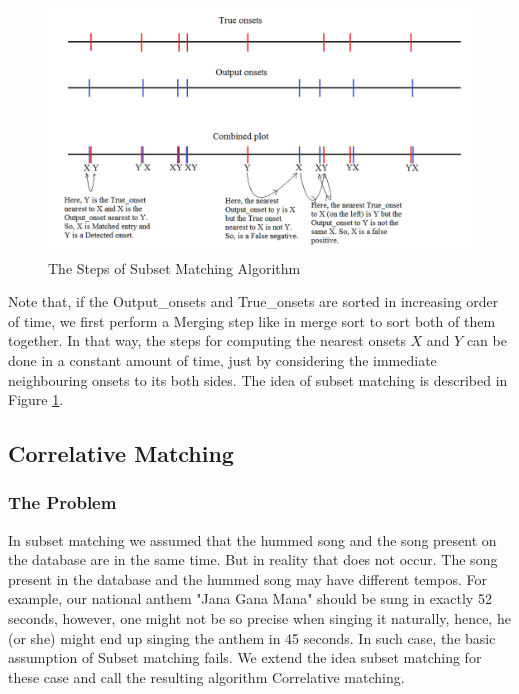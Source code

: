 \documentclass[10pt]{article}
\begin{document}
\begin{figure}
    \centering
    \includegraphics[width = \textwidth]{subset_matching.png}
    \caption{The Steps of Subset Matching Algorithm}
    \label{fig:subset_matching}
\end{figure}

Note that, if the Output\_onsets and True\_onsets are sorted in increasing order of time, we first perform a Merging step like in merge sort to sort both of them together. In that way, the steps for computing the nearest onsets $X$ and $Y$ can be done in a constant amount of time, just by considering the immediate neighbouring onsets to its both sides. The idea of subset matching is described in Figure \ref{fig:subset_matching}.

\subsection{Correlative Matching}

\subsubsection{The Problem}
In subset matching we assumed that the hummed song and the song present on the database are in the same time. But in reality that does not occur. The song present in the database and the hummed song may have different tempos. For example, our national anthem "Jana Gana Mana" should be sung in exactly 52 seconds, however, one might not be so precise when singing it naturally, hence, he (or she) might end up singing the anthem in 45 seconds. In such case, the basic assumption of Subset matching fails. We extend the idea subset matching for these case and call the resulting algorithm Correlative matching.
\end{document}

